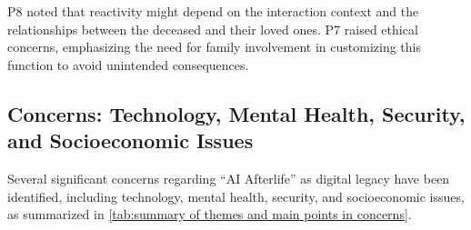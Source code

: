 P8 noted that reactivity might depend on the interaction context and the relationships between the deceased and their loved ones. P7 raised ethical concerns, emphasizing the need for family involvement in customizing this function to avoid unintended consequences. 

\subsection{Concerns: Technology, Mental Health, Security, and Socioeconomic Issues}\label{concerns}

Several significant concerns regarding ``AI Afterlife'' as digital legacy have been identified, including technology, mental health, security, and socioeconomic issues, as summarized in \autoref{tab:summary of themes and main points in concerns}.


